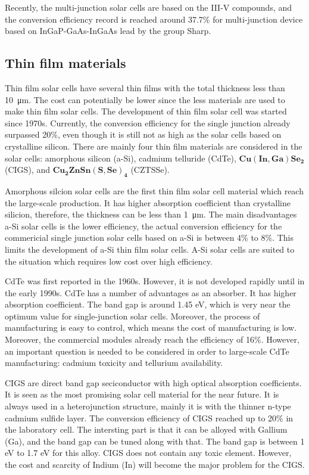 \documentclass[a4paper, 12pt, titlepage,oneside,drop]{kthesis}
\begin{document}
Recently, the multi-junction solar cells are based on the III-V compounds, and the conversion efficiency record is reached around 37.7\% for multi-junction
device based on InGaP-GaAs-InGaAs lead by the group Sharp.

\subsection{Thin film materials}

Thin film solar cells have several thin films with the total thickness less than \SI{10} {\micro\meter}. The cost can potentially be lower since the less materials are used to make thin film solar cells. The development of thin film
solar cell was started since 1970s. Currently, the conversion efficiency for the single junction already surpassed 20\%, even though it is still not as high as the solar cells based on crystalline silicon. There are mainly four 
thin film materials are considered in the solar cells: amorphous silicon (a-Si), cadmium telluride (CdTe), $\mathbf {Cu(In, Ga)Se_2}$ (CIGS),  and $\mathbf {Cu_{2}ZnSn(S,Se)_{4}}$ (CZTSSe).

Amorphous silcion solar cells are the first thin film solar cell material which reach the large-scale production. It has higher absorption coefficient than crystalline silicion, therefore, the thickness can be less than \SI{1} {\micro\meter}. The 
main disadvantages a-Si solar cells is the lower efficiency, the actual conversion efficiency for the commericial single junction solar cells based on a-Si is between 4\% to 8\%. This limits the development of a-Si thin film solar cells.
A-Si solar cells are suited to the situation which requires low cost over high efficiency. 

CdTe was first reported in the 1960s. However, it is not developed rapidly until in the early 1990s. CdTe has a number of advantages as an absorber. It has higher absorption coefficient. The band gap is around 1.45 eV, which 
is very near the optimum value for single-junction solar cells. Moreover, the process
of manufacturing is easy to control, which means the cost of manufacturing is low. Moreover, the commercial modules already reach the efficiency of 16\%. However, an important question is needed to be considered in order to large-scale CdTe
manufacturing: cadmium toxicity and tellurium availability. 

CIGS are direct band gap seciconductor with high optical absorption coefficients. It is seen as the most promising solar cell material for the near future. It is always used in a heterojunction structure, mainly it is with the thinner
n-type cadmium sulfide layer. The conversion efficiency of CIGS reached up to 20\% in the laboratory cell. The intersting part is that it can be alloyed with Gallium (Ga), and the band gap can be tuned along with that. The band gap 
is between 1 eV to 1.7 eV for this alloy. CIGS does not contain any toxic element. However, the cost and scarcity of Indium (In) will become the major problem for the CIGS.
\end{document}
